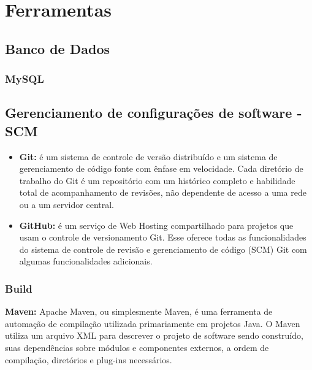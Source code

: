 \chapter{Ferramentas}

\section{Banco de Dados}

\subsection{MySQL} 


\section{Gerenciamento de configurações de software - SCM}

\begin{itemize}

\item \textbf{Git:} é um sistema de controle de versão distribuído e um sistema de gerenciamento de código fonte com ênfase em velocidade. Cada diretório de trabalho do Git é um repositório com um histórico completo e habilidade total de acompanhamento de revisões, não dependente de acesso a uma rede ou a um servidor central.

\item \textbf{GitHub:} é um serviço de Web Hosting compartilhado para projetos que usam o controle de versionamento Git. Esse oferece todas as funcionalidades do sistema de controle de revisão e gerenciamento de código (SCM) Git com algumas funcionalidades adicionais.


\end{itemize}

\subsection{Build}

\textbf{Maven:} Apache Maven, ou simplesmente Maven, é uma ferramenta de automação de compilação utilizada primariamente em projetos Java. O Maven utiliza um arquivo XML para descrever o projeto de software sendo construído, suas dependências sobre módulos e componentes externos, a ordem de compilação, diretórios e plug-ins necessários.

